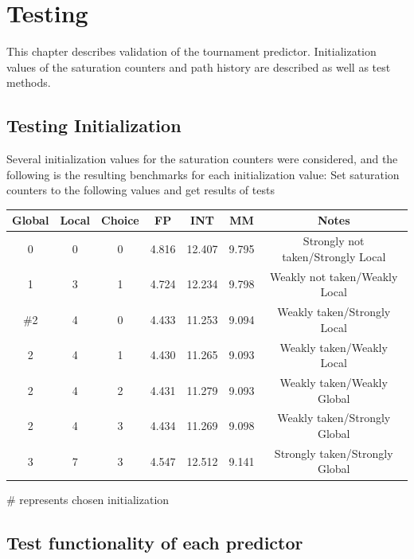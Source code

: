 \documentclass[]{report}   %
\begin{document}
\chapter{Testing}
This chapter describes validation of the tournament predictor. Initialization values of the saturation counters and path history are described as well as test methods.

\section{Testing Initialization}
Several initialization values for the saturation counters were considered, and the following is the resulting benchmarks for each initialization value:
Set saturation counters to the following values and get results of tests\\

\begin{center}
  \begin{tabular} { c c c c c c c }
    Global & Local & Choice & FP & INT & MM & Notes\\
    \hline
      0 & 0 & 0 & 4.816 & 12.407 & 9.795 & Strongly not taken/Strongly Local\\
      1 & 3 & 1 & 4.724 & 12.234 & 9.798 & Weakly not taken/Weakly Local\\
      \#2 & 4 & 0 & 4.433 & 11.253 & 9.094 & Weakly taken/Strongly Local\\
      2 & 4 & 1 & 4.430 & 11.265 & 9.093 & Weakly taken/Weakly Local\\
      2 & 4 & 2 & 4.431 & 11.279 & 9.093 & Weakly taken/Weakly Global\\
      2 & 4 & 3 & 4.434 & 11.269 & 9.098 & Weakly taken/Strongly Global\\
      3 & 7 & 3 & 4.547 & 12.512 & 9.141 & Strongly taken/Strongly Global\\
  \end{tabular}
\end{center}
\# represents chosen initialization

\section{Test functionality of each predictor}
\end{document}

